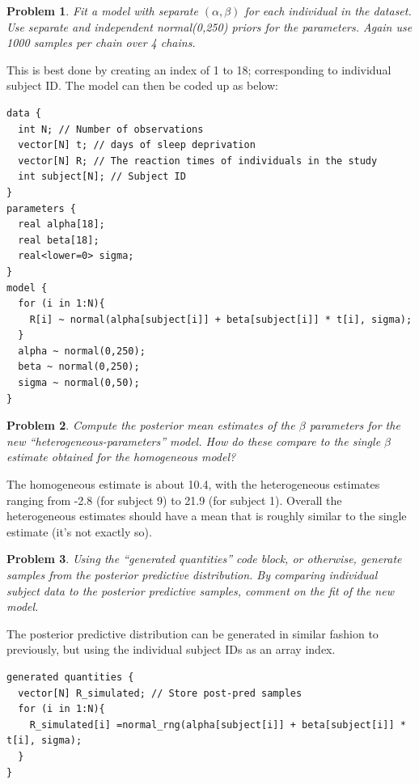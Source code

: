 \documentclass{article}
\newtheorem{problem}{Problem}[section]
\begin{document}
\begin{problem}
	Fit a model with separate $(\alpha,\beta)$ for each individual in the dataset. Use separate and independent normal(0,250) priors for the parameters. Again use 1000 samples per chain over 4 chains.
\end{problem}

This is best done by creating an index of 1 to 18; corresponding to individual subject ID. The model can then be coded up as below:

\begin{verbatim}
data {
  int N; // Number of observations
  vector[N] t; // days of sleep deprivation
  vector[N] R; // The reaction times of individuals in the study
  int subject[N]; // Subject ID
}
parameters {
  real alpha[18];
  real beta[18];
  real<lower=0> sigma;
} 
model {
  for (i in 1:N){
    R[i] ~ normal(alpha[subject[i]] + beta[subject[i]] * t[i], sigma);
  }
  alpha ~ normal(0,250);
  beta ~ normal(0,250);
  sigma ~ normal(0,50);
}
\end{verbatim}

\begin{problem}
	Compute the posterior mean estimates of the $\beta$ parameters for the new ``heterogeneous-parameters'' model. How do these compare to the single $\beta$ estimate obtained for the homogeneous model?
\end{problem}

The homogeneous estimate is about 10.4, with the heterogeneous estimates ranging from -2.8 (for subject 9) to 21.9 (for subject 1). Overall the heterogeneous estimates should have a mean that is roughly similar to the single estimate (it's not exactly so).

\begin{problem}
	Using the ``generated quantities'' code block, or otherwise, generate samples from the posterior predictive distribution. By comparing individual subject data to the posterior predictive samples, comment on the fit of the new model.
\end{problem}

The posterior predictive distribution can be generated in similar fashion to previously, but using the individual subject IDs as an array index.
\begin{verbatim}
generated quantities {
  vector[N] R_simulated; // Store post-pred samples
  for (i in 1:N){
    R_simulated[i] =normal_rng(alpha[subject[i]] + beta[subject[i]] * t[i], sigma);
  }
}
\end{verbatim}
\end{document}
